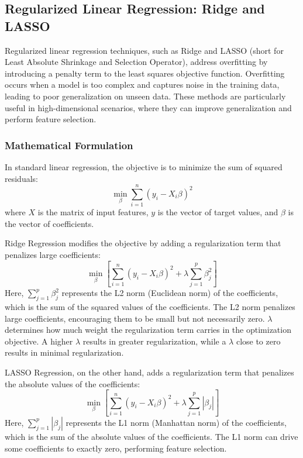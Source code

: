 \documentclass[english,11pt,a4paper,titlepage]{article}
\begin{document}
	\subsection*{Regularized Linear Regression: Ridge and LASSO}
	Regularized linear regression techniques, such as Ridge and LASSO (short for Least Absolute Shrinkage and Selection Operator), address overfitting by introducing a penalty term to the least squares objective function. Overfitting occurs when a model is too complex and captures noise in the training data, leading to poor generalization on unseen data. These methods are particularly useful in high-dimensional scenarios, where they can improve generalization and perform feature selection.
	
	\subsubsection*{Mathematical Formulation}
	In standard linear regression, the objective is to minimize the sum of squared residuals:
	\begin{equation*} 
		\min_\beta \sum_{i=1}^{n}(y_i - X_i\beta)^2
	\end{equation*}
	where $X$ is the matrix of input features, $y$ is the vector of target values, and $\beta$ is the vector of coefficients. 
	
	Ridge Regression modifies the objective by adding a regularization term that penalizes large coefficients:
	\begin{equation*}
		\min_\beta \left[\sum_{i=1}^{n}(y_i - X_i\beta)^2 + \lambda \sum_{j=1}^{p}\beta_{j}^{2}\right]
	\end{equation*}
	Here, $\sum_{j=1}^{p}\beta_{j}^{2}$ represents the L2 norm (Euclidean norm) of the coefficients, which is the sum of the squared values of the coefficients. The L2 norm penalizes large coefficients, encouraging them to be small but not necessarily zero. \( \lambda \) determines how much weight the regularization term carries in the optimization objective. A higher \( \lambda \) results in greater regularization, while a \( \lambda \) close to zero results in minimal regularization.
	
	LASSO Regression, on the other hand, adds a regularization term that penalizes the absolute values of the coefficients:
	\begin{equation*}
		\min_\beta \left[\sum_{i=1}^{n}(y_i - X_i\beta)^2 + \lambda \sum_{j=1}^{p}|\beta_{j}|\right]
	\end{equation*}
	Here, $\sum_{j=1}^{p}|\beta_{j}|$ represents the L1 norm (Manhattan norm) of the coefficients, which is the sum of the absolute values of the coefficients. The L1 norm can drive some coefficients to exactly zero, performing feature selection.
	
\end{document}
